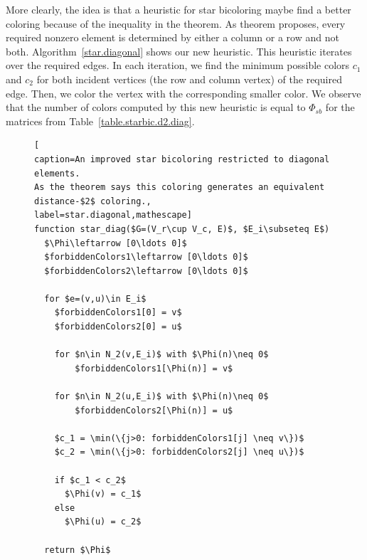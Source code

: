 \documentclass[12pt, twoside,a4paper,toc=bibliography]{scrbook}
\newcommand{\coderef}[1]{Algorithm~\protect\ref{#1}}
\begin{document}
More clearly, the idea is that a heuristic for star bicoloring maybe
find a better coloring because of the inequality in the theorem.
As theorem proposes, every required nonzero element
is determined by either a column or a row and not both.
\coderef{star.diagonal} shows our new heuristic. This heuristic
iterates over the required edges.
In each iteration, we find the minimum possible colors $c_1$ and $c_2$
for both incident vertices (the row and column vertex) of the required edge.
Then, we color the vertex with the corresponding smaller color.
We observe that the number of colors computed by this new heuristic is equal to $\Phi_{sb}$
for the matrices from Table~\ref{table.starbic.d2.diag}.

\begin{figure}
\begin{lstlisting}[
caption=An improved star bicoloring restricted to diagonal elements.
As the theorem says this coloring generates an equivalent distance-$2$ coloring.,
label=star.diagonal,mathescape]
function star_diag($G=(V_r\cup V_c, E)$, $E_i\subseteq E$)
  $\Phi\leftarrow [0\ldots 0]$
  $forbiddenColors1\leftarrow [0\ldots 0]$
  $forbiddenColors2\leftarrow [0\ldots 0]$

  for $e=(v,u)\in E_i$
    $forbiddenColors1[0] = v$
    $forbiddenColors2[0] = u$

    for $n\in N_2(v,E_i)$ with $\Phi(n)\neq 0$
        $forbiddenColors1[\Phi(n)] = v$

    for $n\in N_2(u,E_i)$ with $\Phi(n)\neq 0$
        $forbiddenColors2[\Phi(n)] = u$

    $c_1 = \min(\{j>0: forbiddenColors1[j] \neq v\})$
    $c_2 = \min(\{j>0: forbiddenColors2[j] \neq u\})$

    if $c_1 < c_2$
      $\Phi(v) = c_1$
    else
      $\Phi(u) = c_2$

  return $\Phi$
\end{lstlisting}
\end{figure}


\clearpage
\end{document}
